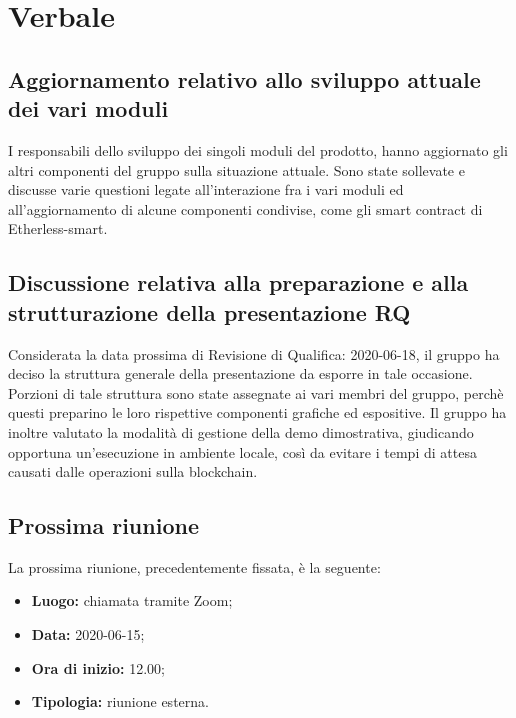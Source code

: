 \section{Verbale}
\subsection{Aggiornamento relativo allo sviluppo attuale dei vari moduli}
I responsabili dello sviluppo dei singoli moduli del prodotto, hanno aggiornato gli altri componenti del gruppo sulla situazione attuale. Sono state sollevate e discusse varie questioni legate all'interazione fra i vari moduli ed all'aggiornamento di alcune componenti condivise, come gli smart contract di Etherless-smart.
\subsection{Discussione relativa alla preparazione e alla strutturazione della presentazione RQ}
Considerata la data prossima di Revisione di Qualifica: 2020-06-18, il gruppo ha deciso la struttura generale della presentazione da esporre in tale occasione. Porzioni di tale struttura sono state assegnate ai vari membri del gruppo, perchè questi preparino le loro rispettive componenti grafiche ed espositive. Il gruppo ha inoltre valutato la modalità di gestione della demo dimostrativa, giudicando opportuna un'esecuzione in ambiente locale, così da evitare i tempi di attesa causati dalle operazioni sulla blockchain.
\subsection{Prossima riunione}
	La prossima riunione, precedentemente fissata, è la seguente:
	\begin{itemize}
		\item \textbf{Luogo:} chiamata tramite Zoom;
		\item \textbf{Data:} 2020-06-15;
		\item \textbf{Ora di inizio:} 12.00;
		\item \textbf{Tipologia:} riunione esterna.
	\end{itemize}
